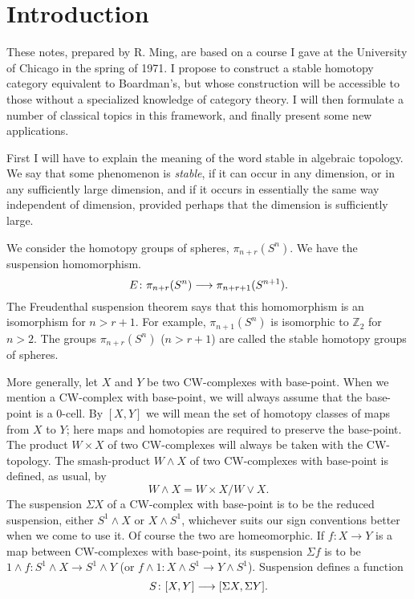 \documentclass[../main]{subfiles}
\begin{document}
\chapter{Introduction}%
\label{sec:p3c01}
These notes, prepared by R. Ming, are based on a course I gave at the University of Chicago in the spring of 1971. I propose to construct a stable homotopy category equivalent to Boardman's, but whose construction will be accessible to those without a specialized knowledge of category theory. I will then formulate a number of classical topics in this framework, and finally present some new applications. 

First I will have to explain the meaning of the word stable in algebraic topology. We say that some phenomenon is \emph{stable}, if it can occur in any dimension, or in any sufficiently large dimension, and if it occurs in essentially the same way independent of dimension, provided perhaps that the dimension is sufficiently large.

\begin{example_different}
    We consider the homotopy groups of spheres, $\pi_{n + r}(S^n)$. We have the suspension homomorphism.
    \[ E \colon \pi_{n + r}(S^n) \longrightarrow \pi_{n + r + 1}(S^{n + 1}). \]
    The Freudenthal suspension theorem says that this homomorphism is an isomorphism for $n > r + 1$. For example, $\pi_{n + 1}(S^n)$ is isomorphic to $\mathbb Z_2$ for $n > 2$. The groups $\pi_{n + r}(S^n)$ ($n > r + 1$) are called the stable homotopy groups of spheres.
\end{example_different}

More generally, let $X$ and $Y$ be two CW-complexes with base-point. When we mention a CW-complex with base-point, we will always assume that the base-point is a $0$-cell. By $[X, Y]$ we will mean the set of homotopy classes of maps from $X$ to $Y$; here maps and homotopies are required to preserve the base-point. The product $W \times X$ of two CW-complexes will always be taken with the CW-topology. The smash-product $W \wedge X$ of two CW-complexes with base-point is defined, as usual, by 
\[ W \wedge X = W \times X/W \vee X .\]
The suspension $\Sigma X$ of a CW-complex with base-point is to be the reduced suspension, either $S^1 \wedge X$ or $X \wedge S^1$, whichever suits our sign conventions better when we come to use it. Of course the two are homeomorphic. If $f \colon X \to Y$ is a map between CW-complexes with base-point, its suspension $\Sigma f$ is to be $1 \wedge f \colon S^1 \wedge X \to S^1 \wedge Y$ (or $f \wedge 1 \colon X \wedge S^1 \to Y \wedge S^1$). Suspension defines a function 
\[ S \colon [X, Y] \longrightarrow [\Sigma X, \Sigma Y] .\]
\end{document}

